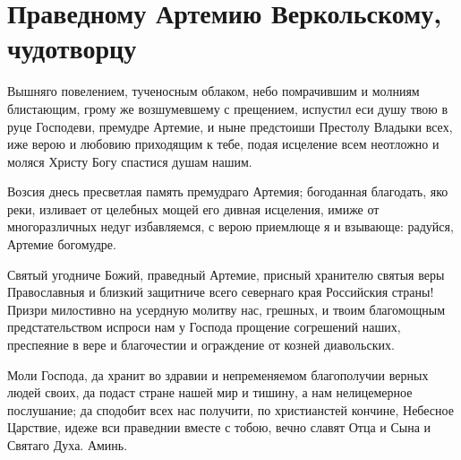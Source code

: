 \section{Праведному Артемию Веркольскому, чудотворцу}\begin{mymulticols}


Вышняго повелением, тученосным облаком, небо помрачившим и молниям блистающим, грому же возшумевшему с прещением, испустил еси душу твою в руце Господеви, премудре Артемие, и ныне предстоиши Престолу Владыки всех, иже верою и любовию приходящим к тебе, подая исцеление всем неотложно и моляся Христу Богу спастися душам нашим.


Возсия днесь пресветлая память премудраго Артемия; богоданная благодать, яко реки, изливает от целебных мощей его дивная исцеления, имиже от многоразличных недуг избавляемся, с верою приемлюще я и взывающе: радуйся, Артемие богомудре.


Святый угодниче Божий, праведный Артемие, присный хранителю святыя веры Православныя и близкий защитниче всего севернаго края Российския страны! Призри милостивно на усердную молитву нас, грешных, и твоим благомощным предстательством испроси нам у Господа прощение согрешений наших, преспеяние в вере и благочестии и ограждение от козней диавольских. 

Моли Господа, да хранит во здравии и непременяемом благополучии верных людей своих, да подаст стране нашей мир и тишину, а нам нелицемерное послушание; да сподобит всех нас получити, по христианстей кончине, Небесное Царствие, идеже вси праведнии вместе с тобою, вечно славят Отца и Сына и Святаго Духа. Аминь.

\end{mymulticols}

\mychapterending


